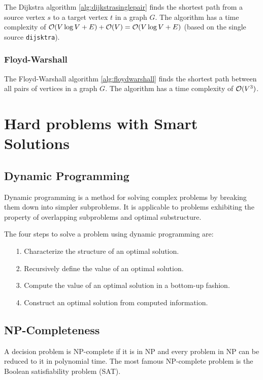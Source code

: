 \documentclass{article}
\begin{document}
The Dijkstra algorithm \ref{alg:dijkstrasinglepair} finds the shortest path from a source vertex $s$ to a target vertex $t$ in a graph $G$. The algorithm has a time complexity of $\mathcal{O}(V\log V+E)+\mathcal{O}(V)=\mathcal{O}(V\log V+E)$ (based on the single source \texttt{dijsktra}).\par


\subsubsection{Floyd-Warshall}
The Floyd-Warshall algorithm \ref{alg:floydwarshall} finds the shortest path between all pairs of vertices in a graph $G$. The algorithm has a time complexity of $\mathcal{O}(V^3)$.\par




\section{Hard problems with Smart Solutions}
\subsection{Dynamic Programming}
Dynamic programming is a method for solving complex problems by breaking them down into simpler subproblems. It is applicable to problems exhibiting the property of overlapping subproblems and optimal substructure.

The four steps to solve a problem using dynamic programming are:
\begin{enumerate}
  \item[1.] Characterize the structure of an optimal solution.
  \item[2.] Recursively define the value of an optimal solution.
  \item[3.] Compute the value of an optimal solution in a bottom-up fashion.
  \item[4.] Construct an optimal solution from computed information.
\end{enumerate}

\subsection{NP-Completeness}
A decision problem is NP-complete if it is in NP and every problem in NP can be reduced to it in polynomial time. The most famous NP-complete problem is the Boolean satisfiability problem (SAT).
\end{document}
